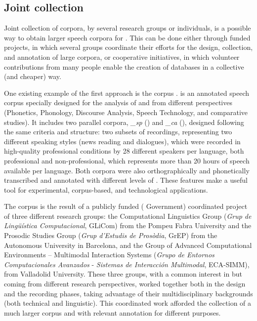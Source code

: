 \documentclass[output=paper]{langsci/langscibook}
\begin{document}
\subsection{Joint collection}\largerpage[-1]
Joint collection of corpora, by several research groups or individuals, is a possible way to obtain larger speech corpora for . This can be done either through funded projects, in which several groups coordinate their efforts for the design, collection, and annotation of large corpora, or cooperative initiatives, in which volunteer contributions from many people enable the creation of databases in a collective (and cheaper) way.

One existing example of the first approach is the  corpus \citep{Garrido2013Glissando}.  is an annotated speech corpus specially designed for the analysis of  and   from different perspectives (Phonetics, Phonology, Discourse Analysis, Speech Technology, and comparative studies). It includes two parallel corpora, \textit{\_sp} () and \textit{\_ca} (), designed following the same criteria and structure: two subsets of recordings, representing two different speaking styles (news reading and dialogues), which were recorded in high-quality professional conditions by 28 different speakers per language, both professional and non-professional, which represents more than 20 hours of speech available per language. Both corpora were also orthographically and phonetically transcribed and annotated with different levels of . These features make  a useful tool for experimental, corpus-based, and technological applications. 

The  corpus is the result of a publicly funded ( Government) coordinated project of three different research groups: the Computational Linguistics Group (\textit{Grup de Lingüística Computacional}, GLiCom) from the Pompeu Fabra University and the Prosodic Studies Group (\textit{Grup d'Estudis de Prosòdia}, GrEP) from the Autonomous University in Barcelona, and the Group of Advanced Computational Environments – Multimodal Interaction Systems (\textit{Grupo de Entornos Computacionales Avanzados} - \textit{Sistemas de Interacción Multimodal}, ECA-SIMM), from Valladolid University. These three groups, with a common interest in  but coming from different research perspectives, worked together both in the design and the recording phases, taking advantage of their multidisciplinary backgrounds (both technical and linguistic). This coordinated work afforded the collection of a much larger corpus and with relevant annotation for different purposes.
\end{document}
